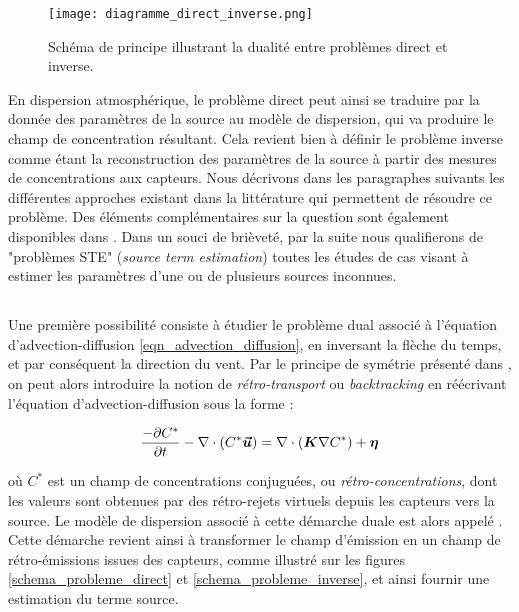 	\begin{figure}
		\centering
		\texttt{[image: diagramme\_direct\_inverse.png]}
		\caption{Schéma de principe illustrant la dualité entre problèmes direct et inverse.}
		\label{fig_diagramme_direct_inverse}
	\end{figure}
	
	
	En dispersion atmosphérique, le problème direct peut ainsi se traduire par la donnée des paramètres de la source au modèle de dispersion, qui va produire le champ de concentration résultant. Cela revient bien à définir le problème inverse comme étant la reconstruction des paramètres de la source à partir des mesures de concentrations aux capteurs. Nous décrivons dans les paragraphes suivants les différentes approches existant dans la littérature qui permettent de résoudre ce problème. Des éléments complémentaires sur la question sont également disponibles dans \cite{Rao2007}. Dans un souci de brièveté, par la suite nous qualifierons de "problèmes STE" (\textit{source term estimation}) toutes les études de cas visant à estimer les paramètres d'une ou de plusieurs sources inconnues.\\
	
	
 \subsection{}
 
 Une première possibilité consiste à étudier le problème dual associé à l'équation d'advection-diffusion  \eqref{eqn_advection_diffusion}, en inversant la flèche du temps, et par conséquent la direction du vent.  Par le principe de symétrie présenté dans \cite{Hourdin2006a}, on peut alors introduire la notion de \textit{rétro-transport} ou \textit{backtracking} en  réécrivant l'équation d'advection-diffusion sous la forme : 
 
 \begin{equation}
 \label{eqn_advection_diffusion_backward}
 \dfrac{-\partial C^*}{\partial t} - \nabla \cdot(C^*\bm{\vec{u}}) = \nabla \cdot (\bm{K}\nabla C^*) + {\bm{\eta}}
 \end{equation}
 
 où $C^*$ est un champ de concentrations conjuguées, ou \textit{rétro-concentrations}, dont les valeurs sont obtenues par des rétro-rejets virtuels depuis les capteurs vers la source. Le modèle de dispersion associé à cette démarche duale est alors appelé . Cette démarche revient ainsi à transformer le champ d'émission  en un champ de rétro-émissions issues des capteurs, comme illustré sur les figures \ref{schema_probleme_direct} et \ref{schema_probleme_inverse}, et ainsi fournir une estimation du terme source.\\
 
